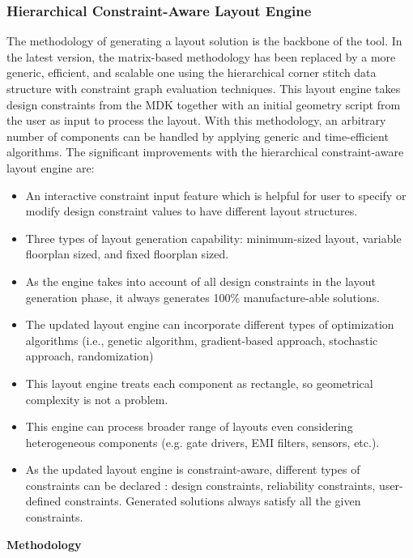 \documentclass[11pt]{article}
\begin{document}
\subsubsection{ Hierarchical Constraint-Aware Layout Engine}
\label{sec-1-3-2}
The methodology of generating a layout solution is the backbone of the tool. In the latest version, the matrix-based methodology has been replaced by a more generic, efficient, and scalable one using the hierarchical corner stitch data structure with constraint graph evaluation techniques. This layout engine takes design constraints from the MDK together with an initial geometry script from the user as input to process the layout. With this methodology, an arbitrary number of components can be handled by applying generic and time-efficient algorithms. The significant improvements with the hierarchical constraint-aware layout engine are: 
\begin{itemize}
    \item An interactive constraint input feature which is helpful for user to specify or modify design constraint values to have different layout structures.
    \item Three types of layout generation capability: minimum-sized layout, variable floorplan sized, and fixed floorplan sized.
    \item As the engine takes into account of all design constraints in the layout generation phase, it always generates 100\% manufacture-able solutions.
    \item The updated layout engine can incorporate different types of optimization algorithms (i.e., genetic algorithm, gradient-based approach, stochastic approach, randomization)
    \item This layout engine treats each component as rectangle, so geometrical complexity is not a problem.
    \item This engine can process broader range of layouts even considering heterogeneous components (e.g. gate drivers, EMI filters, sensors, etc.).
    \item As the updated layout engine is constraint-aware, different types of constraints can be declared : design constraints, reliability constraints, user-defined constraints. Generated solutions always satisfy all the given constraints.

\end{itemize}
\textbf{Methodology}\\
\end{document}
